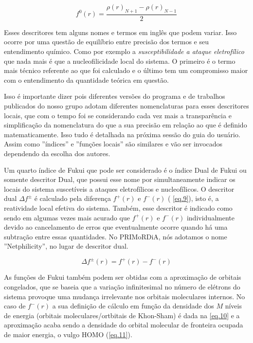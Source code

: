 \documentclass[a4paper,11pt]{refart}
\begin{document}
\begin{equation}
f^{0}(r) = \frac{\rho(r)_{N+1} -\rho (r)_{N-1}}{2}
\label{eq.8}
\end{equation}

Esses descritores tem alguns nomes e termos em inglês que podem variar. Isso ocorre por uma questão de equilíbrio entre precisão dos termos e seu entendimento químico. Como por exemplo a \textit{susceptibilidade a ataque eletrofílico} que nada mais é que a nucleofilicidade local do sistema. O primeiro é o termo mais técnico referente ao que foi calculado e o último tem um compromisso maior com o entendimento da quantidade teórica em questão.

Isso é importante dizer pois diferentes versões do programa e de trabalhos publicados do nosso grupo adotam diferentes nomenclaturas para esses descritores locais, que com o tempo foi se considerando cada vez mais a transparência e simplificação da nomenclatura do que a sua precisão em relação ao que é definido matematicamente. Isso tudo é detalhada na próxima sessão do guia do usuário. Assim como ''índices'' e ''funções locais'' são similares e vão ser invocados dependendo da escolha dos autores. 

Um quarto índice de Fukui que pode ser considerado é o índice Dual de Fukui ou somente descritor Dual, que possui esse nome por simultaneamente indicar os locais do sistema suscetíveis a ataques eletrofílicos e nucleofílicos. O descritor dual $\Delta f^{\pm}$ é calculado pela diferença $f^{+}(r)$ e $f^{-}(r)$ ( \autoref{eq.9}), isto é, a reatividade local efetiva do sistema. Também, esse descritor é indicado como sendo em algumas vezes mais acurado que  $f^{+}(r)$ e $f^{-}(r)$ individualmente devido ao cancelamento de erros que eventualmente ocorre quando há uma subtração entre essas quantidades\cite{martinez2015dual}. No PRIMoRDiA, nós adotamos o nome ''Netphilicity'', no lugar de descritor dual. 


\begin{equation}
\Delta f^{\pm}(r) = f^{+}(r) - f^{-}(r)
\label{eq.9}
\end{equation}

As funções de Fukui também podem ser obtidas com a aproximação de orbitais congelados, que se baseia que a variação infinitesimal no número de elétrons do sistema provoque uma mudança irrelevante nos orbitais moleculares internos. No caso de $f^{-}(r)$ a sua definição de cálculo em função da densidade dos $M$ níveis de energia (orbitais moleculares/ortbitais de Khon-Sham) é dada na \autoref{eq.10} e a aproximação acaba sendo a densidade do orbital molecular de fronteira ocupada de maior energia, o vulgo HOMO (\autoref{eq.11}). 
\end{document}
